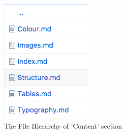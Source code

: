 \begin{figure}[H]
    \centering
    \begin{subfigure}[b]{0.25\textwidth}
        \includegraphics[width=\textwidth]{figures/documentation_md_example_1}
        \captionsetup{justification=centering}
        \caption{The File Hierarchy of 'Content' section}
        \label{fig:hierarchy}
    \end{subfigure}
    \qquad
    \begin{subfigure}[b]{0.4\textwidth}

\end{subfigure}
\end{figure}
